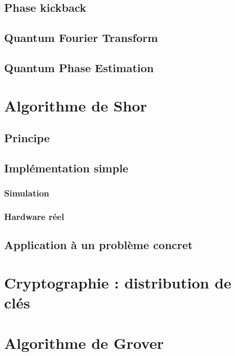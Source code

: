 \documentclass[11pt]{report}
\begin{document}
\section{Phase kickback}
\lipsum[2-4]

\section{Quantum Fourier Transform}
\lipsum[2-4]

\section{Quantum Phase Estimation}
\lipsum[2-4]

\chapter{Algorithme de Shor}
\lipsum[2-4]

\section{Principe}
\lipsum[2-4]

\section{Implémentation simple}
\lipsum[2-4]

\subsection{Simulation}
\lipsum[2-4]

\subsection{Hardware réel}
\lipsum[2-4]

\section{Application à un problème concret}
\lipsum[2-4]

\chapter{Cryptographie : distribution de clés}

\chapter{Algorithme de Grover}
\lipsum[2-4]
\end{document}
